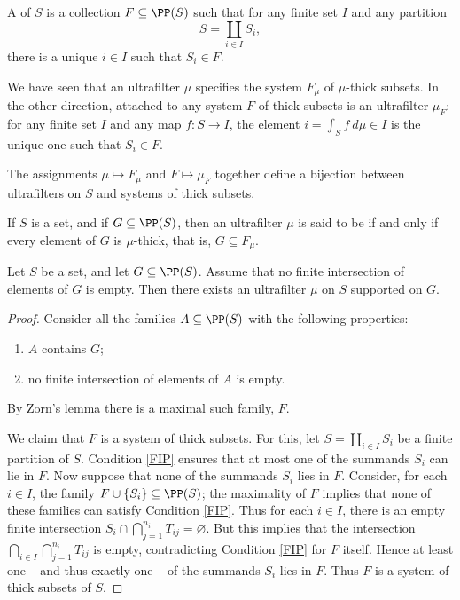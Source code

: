 \begin{definition}
	A  of $ S $ is a collection $ F \subseteq \PP(S) $ such that for any finite set $ I $ and any partition
	\[
		S = \coprod_{ i \in I } S_i \comma
	\]
	there is a unique $ i \in I $ such that $ S_i \in F $.
\end{definition}

\begin{construction}
	We have seen that an ultrafilter $ \mu $ specifies the system $ F_{\mu} $ of $ \mu $-thick subsets.
	In the other direction, attached to any system $F$ of thick subsets is an ultrafilter $\mu_F$: for any finite set $ I $ and any map $ f \colon S \to I $, the element $ i = \int_S f \ d \mu \in I $ is the unique one such that $ S_i \in F$.

	The assignments $ \mu \mapsto F_{\mu} $ and $ F \mapsto \mu_F $ together define a bijection between ultrafilters on $S$ and systems of thick subsets.
\end{construction}

\begin{definition}
	If $ S $ is a set, and if $ G \subseteq \PP(S) $, then an ultrafilter $ \mu $ is said to be  if and only if every element of $G$ is $ \mu $-thick, that is, $ G \subseteq F_{\mu} $.
\end{definition}

\begin{lemma} \label{generateultrafilters}
	Let $ S $ be a set, and let $ G \subseteq \PP(S) $.
	Assume that no finite intersection of elements of $ G $ is empty.
	Then there exists an ultrafilter $ \mu $ on $ S $ supported on $ G $.
\end{lemma}

\begin{proof}
	Consider all the families $ A \subseteq \PP(S) $ with the following properties:
	\begin{enumerate}
		\item $ A $ contains $ G $;
		\item \label{FIP} no finite intersection of elements of $ A $ is empty.
	\end{enumerate}
	By Zorn's lemma there is a maximal such family, $ F $.

	We claim that $ F $ is a system of thick subsets.
	For this, let $ S = \coprod_{i \in I} S_i $ be a finite partition of $ S $.
	Condition \ref{FIP} ensures that at most one of the summands $ S_i $ can lie in $ F $.
	Now suppose that none of the summands $ S_i $ lies in $ F $.
	Consider, for each $ i \in I $, the family $ F \cup \{ S_i \} \subseteq \PP(S) $;
	the maximality of $ F $ implies that none of these families can satisfy Condition \ref{FIP}.
	Thus for each $ i \in I $, there is an empty finite intersection
	$S_i \cap \bigcap_{j = 1}^{n_i} T_{ij} = \varnothing $.
	But this implies that the intersection $ \bigcap_{i \in I}\bigcap_{j = 1}^{n_i} T_{ij} $ is empty, contradicting Condition \ref{FIP} for $ F $ itself.
	Hence at least one -- and thus exactly one -- of the summands $ S_i $ lies in $ F $.
	Thus $ F $ is a system of thick subsets of $ S $.
\end{proof}

